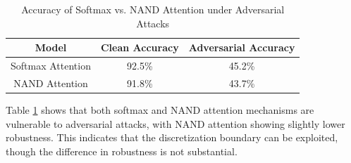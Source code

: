 \documentclass[11pt]{article}
\theoremstyle{definition}
\begin{document}
\begin{table}[h]






\centering






\begin{tabular}{|c|c|c|}






\hline






Model & Clean Accuracy & Adversarial Accuracy \\






\hline






Softmax Attention & 92.5\% & 45.2\% \\






NAND Attention & 91.8\% & 43.7\% \\






\hline






\end{tabular}






\caption{Accuracy of Softmax vs. NAND Attention under Adversarial Attacks}






\label{tab:adversarial_accuracy}






\end{table}













Table \ref{tab:adversarial_accuracy} shows that both softmax and NAND attention mechanisms are vulnerable to adversarial attacks, with NAND attention showing slightly lower robustness. This indicates that the discretization boundary can be exploited, though the difference in robustness is not substantial.
\end{document}
